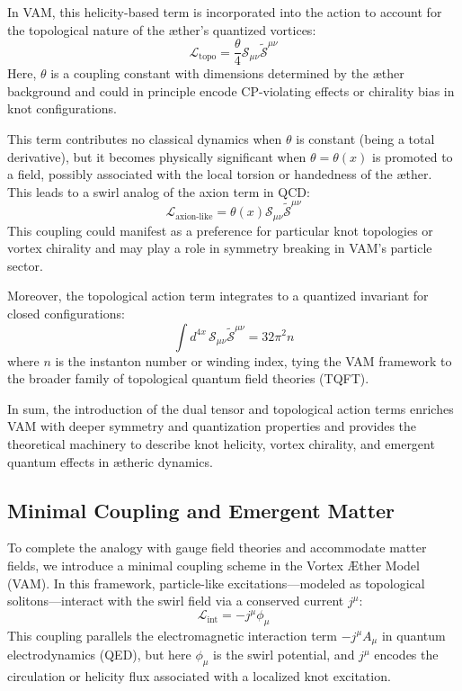         In VAM, this helicity-based term is incorporated into the action to account for the topological nature of the æther's quantized vortices:
        \begin{equation}
            \mathcal{L}_{\text{topo}} = \frac{\theta}{4} \mathcal{S}_{\mu\nu} \tilde{\mathcal{S}}^{\mu\nu}
        \end{equation}
        Here, $\theta$ is a coupling constant with dimensions determined by the æther background and could in principle encode CP-violating effects or chirality bias in knot configurations.

        This term contributes no classical dynamics when $\theta$ is constant (being a total derivative), but it becomes physically significant when $\theta = \theta(x)$ is promoted to a field, possibly associated with the local torsion or handedness of the æther. This leads to a swirl analog of the axion term in QCD:
        \begin{equation}
            \mathcal{L}_{\text{axion-like}} = \theta(x) \mathcal{S}_{\mu\nu} \tilde{\mathcal{S}}^{\mu\nu}
        \end{equation}
        This coupling could manifest as a preference for particular knot topologies or vortex chirality and may play a role in symmetry breaking in VAM's particle sector.

        Moreover, the topological action term integrates to a quantized invariant for closed configurations:
        \begin{equation}
            \int d^{4x} \, \mathcal{S}_{\mu\nu} \tilde{\mathcal{S}}^{\mu\nu} = 32 \pi^2 n
        \end{equation}
        where $n$ is the instanton number or winding index, tying the VAM framework to the broader family of topological quantum field theories (TQFT).

        In sum, the introduction of the dual tensor and topological action terms enriches VAM with deeper symmetry and quantization properties and provides the theoretical machinery to describe knot helicity, vortex chirality, and emergent quantum effects in ætheric dynamics.

        \subsection{Minimal Coupling and Emergent Matter}
        To complete the analogy with gauge field theories and accommodate matter fields, we introduce a minimal coupling scheme in the Vortex Æther Model (VAM). In this framework, particle-like excitations---modeled as topological solitons---interact with the swirl field via a conserved current $j^\mu$:
        \begin{equation}
            \mathcal{L}_{\text{int}} = -j^\mu \phi_\mu
        \end{equation}
        This coupling parallels the electromagnetic interaction term $-j^\mu A_\mu$ in quantum electrodynamics (QED), but here $\phi_\mu$ is the swirl potential, and $j^\mu$ encodes the circulation or helicity flux associated with a localized knot excitation.

